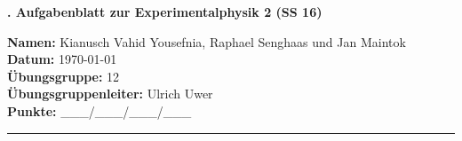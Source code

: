 \begin{centering}
  \vspace*{5pt}
  \Large{\textbf{\nr. Aufgabenblatt zur Experimentalphysik 2 (SS 16)}}\\
  \vspace*{10pt}
  \huge{\textbf{\tit}}
  \vspace*{10pt}

\normalsize{\textbf{Namen:} Kianusch Vahid Yousefnia, Raphael Senghaas und Jan Maintok} \\
\textbf{Datum: } \today \\
 \textbf{Übungsgruppe:} 12\\
 \textbf{Übungsgruppenleiter:} Ulrich Uwer \\

\vspace*{10pt}
 \textbf{Punkte: } \_\_\_/\_\_\_/\_\_\_/\_\_\_
 
 \end{centering}

 \vspace*{25pt}

 \rule{\textwidth}{1pt}


